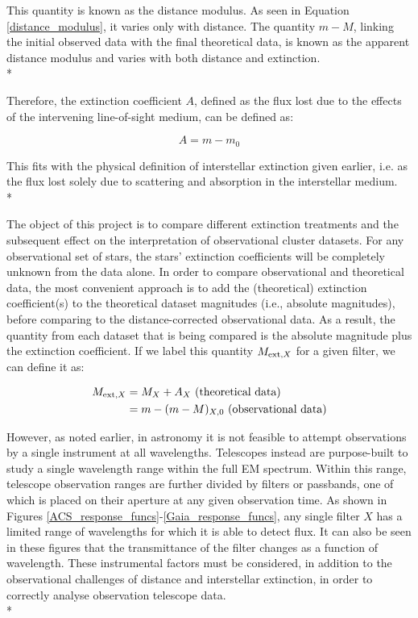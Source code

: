 \documentclass[12pt, a4paper]{report}
\begin{document}
This quantity is known as the distance modulus. As seen in Equation \ref{distance_modulus}, it varies only with distance. The quantity $m - M $, linking the initial observed data with the final theoretical data, is known as the apparent distance modulus and varies with both distance and extinction. \\*

Therefore, the extinction coefficient $A$, defined as the flux lost due to the effects of the intervening line-of-sight medium, can be defined as:

\begin{equation}
\label{bol_extinc}
A = m - m_{0}
\end{equation}

This fits with the physical definition of interstellar extinction given earlier, i.e. as the flux lost solely due to scattering and absorption in the interstellar medium. \\*

The object of this project is to compare different extinction treatments and the subsequent effect on the interpretation of observational cluster datasets. For any observational set of stars, the stars' extinction coefficients will be completely unknown from the data alone. In order to compare observational and theoretical  data, the most convenient approach is to add the (theoretical) extinction coefficient(s) to the theoretical dataset magnitudes (i.e., absolute magnitudes), before comparing to the distance-corrected observational data. As a result, the quantity from each dataset that is being compared is the absolute magnitude plus the extinction coefficient. If we label this quantity $M_{\textnormal{ext},X}$ for a given filter, we can define it as:

\begin{align}
\begin{split}
M_{\textnormal{ext},X} &= M_{X} + A_{X} \textnormal{ (theoretical data)}\\
 &= m - (m - M)_{X,0} \textnormal{ (observational data)}
\end{split}
\label{MextX_eq}
\end{align}


However, as noted earlier, in astronomy it is not feasible to attempt observations by a single instrument at all wavelengths. Telescopes instead are purpose-built to study a single wavelength range within the full EM spectrum. Within this range, telescope observation ranges are further divided by filters or passbands, one of which is placed on their aperture at any given observation time. As shown in Figures \ref{ACS_response_funcs}-\ref{Gaia_response_funcs}, any single filter $X$ has a limited range of wavelengths for which it is able to detect flux. It can also be seen in these figures that the transmittance of the filter changes as a function of wavelength. These instrumental factors must be considered, in addition to the observational challenges of distance and interstellar extinction, in order to correctly analyse observation telescope data. \\*
\end{document}
